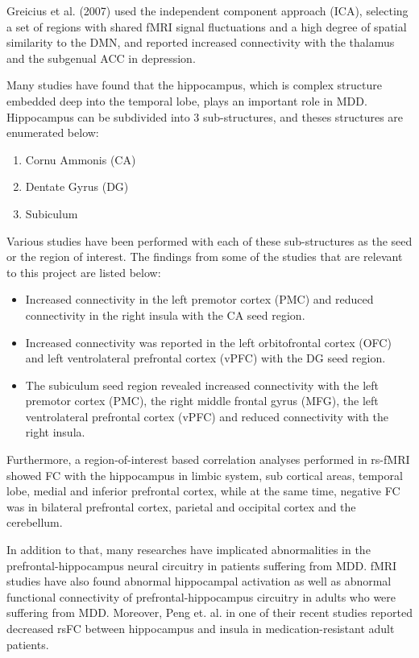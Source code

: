 \documentclass{article}
\begin{document}
Greicius et al. (2007) used the independent component approach (ICA),
selecting a set of regions with shared fMRI signal fluctuations and a
high degree of spatial similarity to the DMN, and reported increased
connectivity with the thalamus and the subgenual ACC in depression.

Many studies have found that the hippocampus, which is complex
structure embedded deep into the temporal lobe, plays an important
role in MDD. Hippocampus can be subdivided into 3 sub-structures, and
theses structures are enumerated below:

\begin{enumerate}[nosep]
    \item Cornu Ammonis (CA)
    \item Dentate Gyrus (DG)
    \item Subiculum
\end{enumerate}

Various studies have been performed with each of these sub-structures
as the seed or the region of interest. The findings from some of the
studies that are relevant to this project are listed below:

\begin{itemize}

    \item Increased connectivity in the left premotor cortex (PMC) and
        reduced connectivity in the right insula with the CA seed
        region.

    \item Increased connectivity was reported in the left
        orbitofrontal cortex (OFC) and left ventrolateral prefrontal
        cortex (vPFC) with the DG seed region.

    \item The subiculum seed region revealed increased connectivity
        with the left premotor cortex (PMC), the right middle frontal
        gyrus (MFG), the left ventrolateral prefrontal cortex (vPFC)
        and reduced connectivity with the right insula.

\end{itemize}

Furthermore, a region-of-interest based correlation analyses performed
in rs-fMRI showed FC with the hippocampus in limbic system, sub
cortical areas, temporal lobe, medial and inferior prefrontal cortex,
while at the same time, negative FC was in bilateral prefrontal
cortex, parietal and occipital cortex and the cerebellum.

\enlargethispage{\baselineskip}
In addition to that, many researches have implicated abnormalities in
the prefrontal-hippocampus neural circuitry in patients suffering from
MDD. fMRI studies have also found abnormal hippocampal activation as
well as abnormal functional connectivity of prefrontal-hippocampus
circuitry in adults who were suffering from MDD. Moreover, Peng et.
al. in one of their recent studies reported decreased rsFC between
hippocampus and insula in medication-resistant adult patients.
\end{document}
